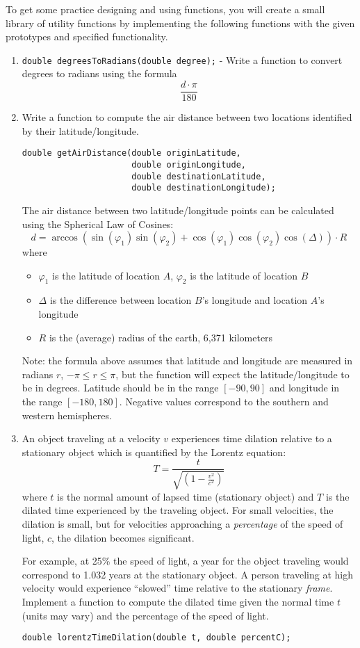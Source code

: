 \documentclass[12pt]{scrartcl}
\begin{document}
To get some practice designing and using functions, you will 
create a small library of utility functions by implementing
the following functions with the given prototypes and specified 
functionality.
\begin{enumerate}
  \item \texttt{double degreesToRadians(double degree);} - Write a 
  	function to convert degrees to radians using the formula 
		$$\frac{d\cdot \pi}{180}$$
\newpage
  \item Write a function to compute the air distance between two locations 
    identified by their latitude/longitude.  
\begin{verbatim}
double getAirDistance(double originLatitude, 
                      double originLongitude, 
                      double destinationLatitude, 
                      double destinationLongitude);
\end{verbatim}  
The air distance between two latitude/longitude points can be calculated 
using the Spherical Law of Cosines:
 $$d = \arccos{(\sin(\varphi_1) \sin(\varphi_2) + \cos(\varphi_1) \cos(\varphi_2) \cos(\Delta) )} \cdot R$$
where
\begin{itemize}
  \item $\varphi_1$ is the latitude of location $A$, $\varphi_2$ is the latitude of location $B$
  \item $\Delta$ is the difference between location $B$'s longitude and location $A$'s longitude
  \item $R$ is the (average) radius of the earth, 6,371 kilometers
\end{itemize}
Note: the formula above assumes that latitude and longitude are measured 
in radians $r$, $-\pi \leq r \leq \pi$, but the function will expect 
the latitude/longitude to be in degrees.  Latitude should be in the range 
$[-90, 90]$ and longitude in the range $[-180, 180]$.  Negative values 
correspond to the southern and western hemispheres.

  \item An object traveling at a velocity $v$ experiences time dilation
  relative to a stationary object which is quantified by the Lorentz equation:
  $$T = \frac{t}{\sqrt{(1-\frac{v^2}{c^2})}}$$
  where $t$ is the normal amount of lapsed time (stationary object) 
  and $T$ is the dilated time experienced by the traveling object.  
  For small velocities, the dilation is small, but for velocities
  approaching a \emph{percentage} of the speed of light, $c$, the 
  dilation becomes significant.
  
  For example, at 25\% the speed of light, a year for the object 
  traveling would correspond to 1.032 years at the stationary object. 
  A person traveling at high velocity would experience ``slowed'' time
  relative to the stationary \emph{frame}.  Implement a function to 
  compute the dilated time given the normal time $t$ (units may vary)
  and the percentage of the speed of light.
\begin{verbatim}
double lorentzTimeDilation(double t, double percentC);
\end{verbatim}

\end{enumerate}  
\end{document}
